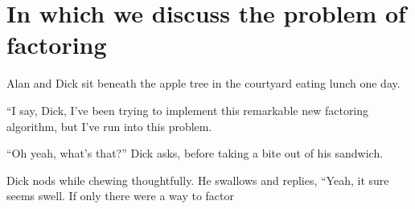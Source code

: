 \section{In which we discuss the problem of factoring}

Alan and Dick sit beneath the apple tree in the courtyard eating
lunch one day.

``I say, Dick, I've been trying to implement this remarkable new
factoring algorithm, but I've run into this problem.

``Oh yeah, what's that?'' Dick asks, before taking a bite out of
his sandwich.

Dick nods while chewing thoughtfully. He swallows and replies,
``Yeah, it sure seems swell. If only there were a way to factor